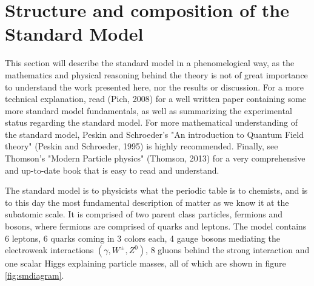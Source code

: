 \section{Structure and composition of the Standard Model}
This section will describe the standard model in a phenomelogical way, as the mathematics and physical reasoning behind the theory is not of great 
importance to understand the work presented here, nor the results or discussion. For a more technical explanation, read (Pich, 2008)\cite{Pich:819632} for a 
well written paper containing some more standard model fundamentals, as well as summarizing the experimental status regarding the standard model.
For more mathematical understanding of the standard model, Peskin and Schroeder's "An introduction to Quantum Field theory" (Peskin and Schroeder, 1995)\cite{Peskin:1995ev}
 is highly recommended. Finally, see Thomson's "Modern Particle physics" (Thomson, 2013)\cite{Thomson:2013zua} for a very comprehensive and up-to-date book that is easy to read and understand. \par
The standard model is to physicists what the periodic table is to chemists, and is to this day the most fundamental description of matter as we know it at the subatomic scale. 
It is comprised of two parent class particles, fermions and bosons, where fermions are comprised of quarks and leptons. The model contains 
6 leptons, 6 quarks coming in 3 colors each, 4 gauge bosons mediating the electroweak interactions $(\gamma, W^{\pm}, Z^{0})$, 8 gluons behind the strong interaction and one 
scalar Higgs explaining particle masses, all of which are shown in figure \ref{fig:smdiagram}.



